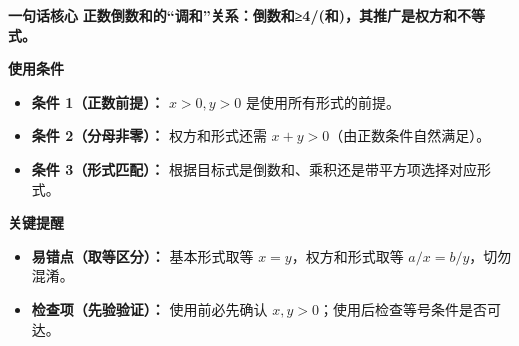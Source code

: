 \begin{summarybox}
\textbf{\textcolor{CSummary}{一句话核心}}
\textbf{正数倒数和的“调和”关系：倒数和≥4/(和)，其推广是权方和不等式。}

\medskip
\textbf{\textcolor{CSummary}{使用条件}}
\begin{itemize}[leftmargin=*, itemsep=0.5em, topsep=0.4em]
    \item \textbf{条件 1（正数前提）：} $x>0, y>0$ 是使用所有形式的前提。
    \item \textbf{条件 2（分母非零）：} 权方和形式还需 $x+y>0$（由正数条件自然满足）。
    \item \textbf{条件 3（形式匹配）：} 根据目标式是倒数和、乘积还是带平方项选择对应形式。
\end{itemize}

\medskip
\textbf{\textcolor{CSummary}{关键提醒}}
\begin{itemize}[leftmargin=*, itemsep=0.5em, topsep=0.4em]
    \item \textbf{易错点（取等区分）：} 基本形式取等 $x=y$，权方和形式取等 $a/x = b/y$，切勿混淆。
    \item \textbf{检查项（先验验证）：} 使用前必先确认 $x,y>0$；使用后检查等号条件是否可达。
\end{itemize}
\end{summarybox}

